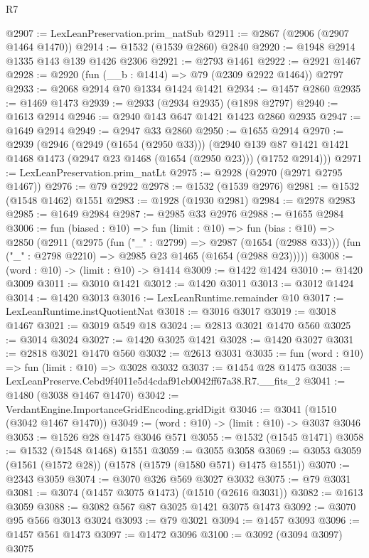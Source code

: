 \begin{lexlean}{R7}
\begin{coremodule}
@2907 := LexLeanPreservation.prim_natSub
@2911 := @2867 (@2906 (@2907 @1464 @1470))
@2914 := @1532 (@1539 @2860) @2840
@2920 := @1948 @2914 @1335 @143 @139 @1426 @2306
@2921 := @2793 @1461
@2922 := @2921 @1467
@2928 := @2920 (fun (__b : @1414) => @79 (@2309 @2922 @1464)) @2797
@2933 := @2068 @2914 @70 @1334 @1424 @1421
@2934 := @1457 @2860
@2935 := @1469 @1473
@2939 := @2933 (@2934 @2935) (@1898 @2797)
@2940 := @1613 @2914
@2946 := @2940 @143 @647 @1421 @1423 @2860 @2935
@2947 := @1649 @2914
@2949 := @2947 @33 @2860
@2950 := @1655 @2914
@2970 := @2939
    (@2946
      (@2949 (@1654 (@2950 @33)))
      (@2940 @139 @87 @1421 @1421 @1468 @1473 (@2947 @23 @1468 (@1654 (@2950 @23))) (@1752 @2914)))
@2971 := LexLeanPreservation.prim_natLt
@2975 := @2928 (@2970 (@2971 @2795 @1467))
@2976 := @79 @2922
@2978 := @1532 (@1539 @2976)
@2981 := @1532 (@1548 @1462) @1551
@2983 := @1928 (@1930 @2981)
@2984 := @2978 @2983
@2985 := @1649 @2984
@2987 := @2985 @33 @2976
@2988 := @1655 @2984
@3006 := fun (biased : @10) =>
  fun (limit : @10) =>
  fun (bias : @10) =>
  @2850
    (@2911
      (@2975
        (fun ("_" : @2799) => @2987 (@1654 (@2988 @33)))
        (fun ("_" : @2798 @2210) => @2985 @23 @1465 (@1654 (@2988 @23)))))
@3008 := (word : @10) -> (limit : @10) -> @1414
@3009 := @1422 @1424
@3010 := @1420 @3009
@3011 := @3010 @1421
@3012 := @1420 @3011
@3013 := @3012 @1424
@3014 := @1420 @3013
@3016 := LexLeanRuntime.remainder @10
@3017 := LexLeanRuntime.instQuotientNat
@3018 := @3016 @3017
@3019 := @3018 @1467
@3021 := @3019 @549 @18
@3024 := @2813 @3021 @1470 @560
@3025 := @3014 @3024
@3027 := @1420 @3025 @1421
@3028 := @1420 @3027
@3031 := @2818 @3021 @1470 @560
@3032 := @2613 @3031
@3035 := fun (word : @10) => fun (limit : @10) => @3028 @3032
@3037 := @1454 @28 @1475
@3038 := LexLeanPreserve.Cebd9f4011e5d4cdaf91cb0042ff67a38.R7.__fits_2
@3041 := @1480 (@3038 @1467 @1470)
@3042 := VerdantEngine.ImportanceGridEncoding.gridDigit
@3046 := @3041 (@1510 (@3042 @1467 @1470))
@3049 := (word : @10) -> (limit : @10) -> @3037 @3046
@3053 := @1526 @28 @1475 @3046 @571
@3055 := @1532 (@1545 @1471)
@3058 := @1532 (@1548 @1468) @1551
@3059 := @3055 @3058
@3069 := @3053 @3059 (@1561 (@1572 @28)) (@1578 (@1579 (@1580 @571) @1475 @1551))
@3070 := @2343 @3059
@3074 := @3070 @326 @569 @3027 @3032
@3075 := @79 @3031
@3081 := @3074 (@1457 @3075 @1473) (@1510 (@2616 @3031))
@3082 := @1613 @3059
@3088 := @3082 @567 @87 @3025 @1421 @3075 @1473
@3092 := @3070 @95 @566 @3013 @3024
@3093 := @79 @3021
@3094 := @1457 @3093
@3096 := @1457 @561 @1473
@3097 := @1472 @3096
@3100 := @3092 (@3094 @3097) @3075

\end{coremodule}
\end{lexlean}
